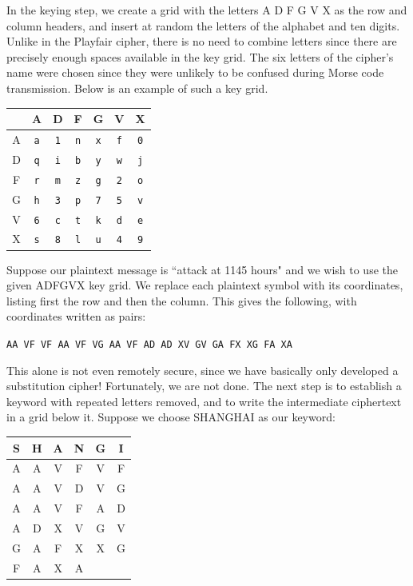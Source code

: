 \documentclass{book}
\theoremstyle{plain}
\theoremstyle{definition}
\newcommand{\ciphertext}[1]{\texttt{#1}} %
\begin{document}
In the keying step, we create a grid with the letters A D F G V X as the row and column headers, and insert at random the letters of the alphabet and ten digits. Unlike in the Playfair cipher, there is no need to combine letters since there are precisely enough spaces available in the key grid. The six letters of the cipher's name were chosen since they were unlikely to be confused during Morse code transmission. Below is an example of such a key grid.
\begin{center}
\begin{tabular}{c|c|c|c|c|c|c|}
& A & D & F & G & V & X \\
\hline
A & \ciphertext{a} & \ciphertext{1} & \ciphertext{n} & \ciphertext{x} & \ciphertext{f} & \ciphertext{0}\\
\hline
D & \ciphertext{q} & \ciphertext{i} & \ciphertext{b} & \ciphertext{y} & \ciphertext{w} & \ciphertext{j}\\
\hline
F & \ciphertext{r} & \ciphertext{m} & \ciphertext{z} & \ciphertext{g} & \ciphertext{2} & \ciphertext{o}\\
\hline
G & \ciphertext{h} & \ciphertext{3} & \ciphertext{p} & \ciphertext{7} & \ciphertext{5} & \ciphertext{v}\\
\hline
V & \ciphertext{6} & \ciphertext{c} & \ciphertext{t} & \ciphertext{k} & \ciphertext{d} & \ciphertext{e}\\
\hline
X & \ciphertext{s} & \ciphertext{8} & \ciphertext{l} & \ciphertext{u} & \ciphertext{4} & \ciphertext{9}\\
\hline
\end{tabular}
\end{center}

Suppose our plaintext message is ``attack at 1145 hours" and we wish to use the given ADFGVX key grid. We replace each plaintext symbol with its coordinates, listing first the row and then the column. This gives the following, with coordinates written as pairs:
\begin{center}
\ciphertext{AA VF VF AA VF VG AA VF AD AD XV GV GA FX XG FA XA}
\end{center}

This alone is not even remotely secure, since we have basically only developed a substitution cipher! Fortunately, we are not done. The next step is to establish a keyword with repeated letters removed, and to write the intermediate ciphertext in a grid below it. Suppose we choose SHANGHAI as our keyword:
\begin{center}
\begin{tabular}{cccccc}
S & H & A & N & G & I \\
\hline
A & A & V & F & V & F \\
A & A & V & D & V & G \\
A & A & V & F & A & D \\
A & D & X & V & G & V \\
G & A & F & X & X & G \\
F & A & X & A & &
\end{tabular}
\end{center}
\end{document}
